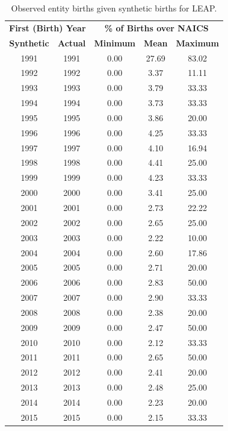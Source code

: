 \documentclass[10pt,twoside]{article}
\begin{document}
\begin{table}[H]
\centering\footnotesize
\caption{Observed entity births given synthetic births for LEAP.} \label{tab:Can:ProbabilityPrivate} \medskip
\renewcommand{\arraystretch}{1}
\begin{tabular}{c c| c c c}
\toprule
\multicolumn{2}{c|}{\textbf{First (Birth) Year}} &  \multicolumn{3}{c}{\textbf{\% of Births over NAICS}}\\
\textbf{Synthetic}&\textbf{Actual}&\textbf{Minimum}&\textbf{Mean}&\textbf{Maximum}\\
\midrule
1991&1991&0.00&27.69&83.02\\
1992&1992&0.00&3.37&11.11\\
1993&1993&0.00&3.79&33.33\\
1994&1994&0.00&3.73&33.33\\
1995&1995&0.00&3.86&20.00\\
1996&1996&0.00&4.25&33.33\\
1997&1997&0.00&4.10&16.94\\
1998&1998&0.00&4.41&25.00\\
1999&1999&0.00&4.23&33.33\\
2000&2000&0.00&3.41&25.00\\
2001&2001&0.00&2.73&22.22\\
2002&2002&0.00&2.65&25.00\\
2003&2003&0.00&2.22&10.00\\
2004&2004&0.00&2.60&17.86\\
2005&2005&0.00&2.71&20.00\\
2006&2006&0.00&2.83&50.00\\
2007&2007&0.00&2.90&33.33\\
2008&2008&0.00&2.38&20.00\\
2009&2009&0.00&2.47&50.00\\
2010&2010&0.00&2.12&33.33\\
2011&2011&0.00&2.65&50.00\\
2012&2012&0.00&2.41&20.00\\
2013&2013&0.00&2.48&25.00\\
2014&2014&0.00&2.23&20.00\\
2015&2015&0.00&2.15&33.33\\
 \bottomrule
\end{tabular} 
\\
\justify
\end{table}
 
\end{document}
